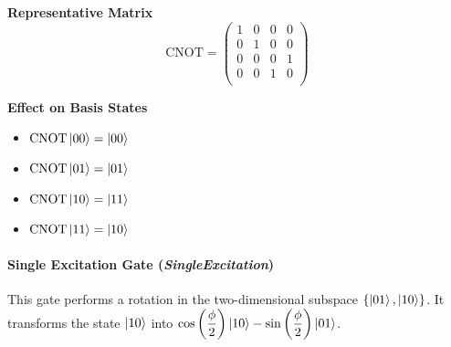 \vspace{0.5em}
\begin{minipage}{\textwidth}
    \begin{minipage}[t]{0.45\textwidth}
        \centering
        \textbf{Representative Matrix}\\[0.5em]
        \[
        \text{CNOT} = 
        \begin{pmatrix}
        1 & 0 & 0 & 0 \\
        0 & 1 & 0 & 0 \\
        0 & 0 & 0 & 1 \\
        0 & 0 & 1 & 0 \\
        \end{pmatrix}
        \]
    \end{minipage}
    \hfill
    \begin{minipage}[t]{0.45\textwidth}
        \centering
        \textbf{Effect on Basis States}\\[0.5em]
        \begin{itemize}
            \item $\text{CNOT}\ket{00} = \ket{00}$
            \item $\text{CNOT}\ket{01} = \ket{01}$
            \item $\text{CNOT}\ket{10} = \ket{11}$
            \item $\text{CNOT}\ket{11} = \ket{10}$
        \end{itemize}
    \end{minipage}
\end{minipage}

\paragraph{Single Excitation Gate (\textit{SingleExcitation})}

This gate performs a rotation in the two-dimensional subspace $\{\ket{01}, \ket{10}\}$. It transforms the state $\ket{10}$ into $\cos\left( \dfrac{\phi}{2} \right) \ket{10} - \sin\left( \dfrac{\phi}{2} \right) \ket{01}$.


